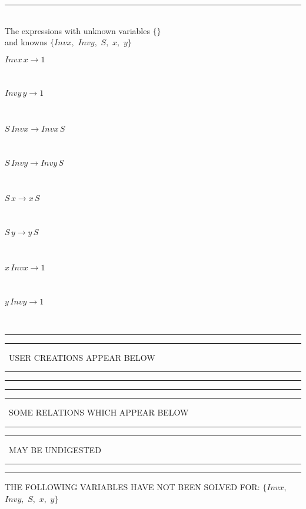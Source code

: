 \rule[3pt]{6in}{.7pt}\\
The expressions with unknown variables $\{\}$\\
and knowns $\{Invx,
$ $
Invy,
$ $
S,
$ $
x,
$ $
y\}$\smallskip\\
\begin{minipage}{6in}
$
Invx\,
 x\rightarrow 1
$
\end{minipage}\medskip \\
\begin{minipage}{6in}
$
Invy\,
 y\rightarrow 1
$
\end{minipage}\medskip \\
\begin{minipage}{6in}
$
S\,
 Invx\rightarrow Invx\,
 S
$
\end{minipage}\medskip \\
\begin{minipage}{6in}
$
S\,
 Invy\rightarrow Invy\,
 S
$
\end{minipage}\medskip \\
\begin{minipage}{6in}
$
S\,
 x\rightarrow x\,
 S
$
\end{minipage}\medskip \\
\begin{minipage}{6in}
$
S\,
 y\rightarrow y\,
 S
$
\end{minipage}\medskip \\
\begin{minipage}{6in}
$
x\,
 Invx\rightarrow 1
$
\end{minipage}\medskip \\
\begin{minipage}{6in}
$
y\,
 Invy\rightarrow 1
$
\end{minipage}\\
\rule[2pt]{6in}{1pt}\hfil\break
\rule[2.5pt]{1.701in}{1pt}
\ USER CREATIONS APPEAR BELOW\ 
\rule[2.5pt]{1.701in}{1pt}\hfil\break
\rule[2pt]{6in}{1pt}\hfil\break
\rule[2pt]{6in}{4pt}\hfil\break
\rule[2pt]{1.45in}{4pt}
\ SOME RELATIONS WHICH APPEAR BELOW\ 
\rule[2pt]{1.45in}{4pt}\hfil\break
\rule[2pt]{2.18in}{4pt}
\ MAY BE UNDIGESTED\ 
\rule[2pt]{2.18in}{4pt}\hfil\break
\rule[2pt]{6in}{4pt}\hfil\break
THE FOLLOWING VARIABLES HAVE NOT BEEN SOLVED FOR:\hfil\break
$\{Invx,
$ $
Invy,
$ $
S,
$ $
x,
$ $
y\}$
\smallskip\\
\vspace{10pt}

